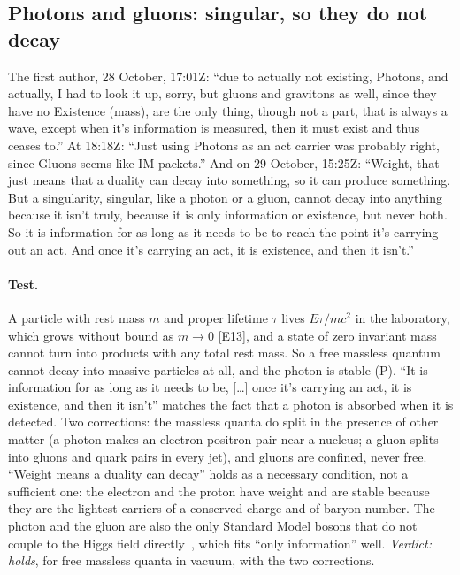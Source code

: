 \documentclass[11pt,a4paper]{article}
\theoremstyle{definition}
\theoremstyle{remark}
\newcommand{\chk}[1]{\textsf{[#1]}}
\newcommand{\tagP}{\textsf{(P)}}
\begin{document}
\subsection{Photons and gluons: singular, so they do not decay}

The first author, 28 October, 17:01Z: ``due to actually not existing, Photons, and actually, I had to look it up, sorry, but gluons and
gravitons as well, since they have no Existence (mass), are the only thing, though not a part, that is always a wave, except when it's
information is measured, then it must exist and thus ceases to.'' At 18:18Z: ``Just using Photons as an act carrier was probably right,
since Gluons seems like IM packets.'' And on 29 October, 15:25Z: ``Weight, that just means that a duality can decay into something, so it
can produce something. But a singularity, singular, like a photon or a gluon, cannot decay into anything because it isn't truly, because it
is only information or existence, but never both. So it is information for as long as it needs to be to reach the point it's carrying out
an act. And once it's carrying an act, it is existence, and then it isn't.''

\paragraph{Test.} A particle with rest mass $m$ and proper lifetime $\tau$ lives $E\tau/mc^2$ in the laboratory, which grows without bound
as $m\to0$ \chk{E13}, and a state of zero invariant mass cannot turn into products with any total rest mass. So a free massless quantum
cannot decay into massive particles at all, and the photon is stable \tagP. ``It is information for as long as it needs to be, [\dots]
once it's carrying an act, it is existence, and then it isn't'' matches the fact that a photon is absorbed when it is detected. Two
corrections: the massless quanta do split in the presence of other matter (a photon makes an electron-positron pair near a nucleus; a
gluon splits into gluons and quark pairs in every jet), and gluons are confined, never free. ``Weight means a duality can decay'' holds as
a necessary condition, not a sufficient one: the electron and the proton have weight and are stable because they are the lightest carriers
of a conserved charge and of baryon number. The photon and the gluon are also the only Standard Model bosons that do not couple to the
Higgs field directly~\cite{atlas22,cms22}, which fits ``only information'' well. \emph{Verdict: holds}, for free massless quanta in vacuum,
with the two corrections.
\end{document}
